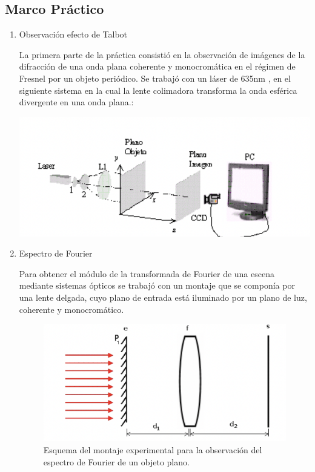 \documentclass{./packages/optica-article}
\begin{document}
\subsection{Marco Práctico}
    \begin{enumerate}
    \item Observación efecto de Talbot
    
La primera parte de la práctica consistió en la observación de imágenes de la difracción de una onda plana coherente y monocromática en el régimen de Fresnel por un objeto periódico. 
Se trabajó con un láser de 635nm , en el siguiente sistema en la cual la lente colimadora transforma la onda esférica divergente en una onda plana.:

\begin{center}
    \includegraphics[scale=1]{sistematalbot.png}
    \label{fig:talbot} %
\end{center}

    \item Espectro de Fourier

Para obtener el módulo de la transformada de Fourier de una escena mediante sistemas ópticos se trabajó con un montaje que se componía por una lente delgada, cuyo plano de entrada está iluminado por un plano de luz, coherente y monocromático. 

\begin{figure}[h]
    \centering
    \includegraphics[scale=1]{sistemaespectrodefourier.png}
    \caption{Esquema del montaje experimental para la observación del espectro de Fourier de un objeto plano. }
    \label{fouriersistema}
    \end{figure}
    

\end{enumerate}
\end{document}

